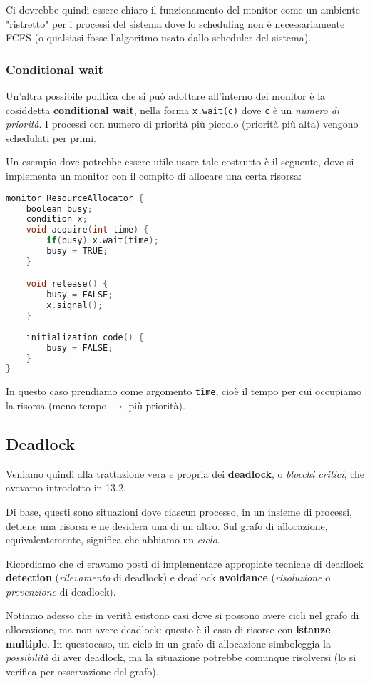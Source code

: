 \documentclass[a4paper,11pt]{article}
\begin{document}
Ci dovrebbe quindi essere chiaro il funzionamento del monitor come un ambiente "ristretto" per i processi del sistema dove lo scheduling non è necessariamente FCFS (o qualsiasi fosse l'algoritmo usato dallo scheduler del sistema).

\subsubsection{Conditional wait}
Un'altra possibile politica che si può adottare all'interno dei monitor è la cosiddetta \textbf{conditional wait}, nella forma \lstinline|x.wait(c)| dove \lstinline|c| è un \textit{numero di priorità}. I processi con numero di priorità più piccolo (priorità più alta) vengono schedulati per primi.

Un esempio dove potrebbe essere utile usare tale costrutto è il seguente, dove si implementa un monitor con il compito di allocare una certa risorsa:
\begin{lstlisting}[language=C++, style=codestyle]	
monitor ResourceAllocator {
	boolean busy;
	condition x;
	void acquire(int time) {
		if(busy) x.wait(time);
		busy = TRUE;
	}

	void release() {
		busy = FALSE;
		x.signal();
	}
	
	initialization code() {
		busy = FALSE;
	}
}
\end{lstlisting}

In questo caso prendiamo come argomento \lstinline|time|, cioè il tempo per cui occupiamo la risorsa (meno tempo $\rightarrow$ più priorità).

\subsection{Deadlock}
Veniamo quindi alla trattazione vera e propria dei \textbf{deadlock}, o \textit{blocchi critici}, che avevamo introdotto in 13.2.

Di base, questi sono situazioni dove ciascun processo, in un insieme di processi, detiene una risorsa e ne desidera una di un altro.
Sul grafo di allocazione, equivalentemente, significa che abbiamo un \textit{ciclo}.

Ricordiamo che ci eravamo posti di implementare appropiate tecniche di deadlock \textbf{detection} (\textit{rilevamento} di deadlock) e deadlock \textbf{avoidance} (\textit{risoluzione} o \textit{prevenzione} di deadlock).

Notiamo adesso che in verità esistono casi dove si possono avere cicli nel grafo di allocazione, ma non avere deadlock: questo è il caso di risorse con \textbf{istanze multiple}. In questocaso, un ciclo in un grafo di allocazione simboleggia la \textit{possibilità} di aver deadlock, ma la situazione potrebbe comunque risolversi (lo si verifica per osservazione del grafo). 
\end{document}
